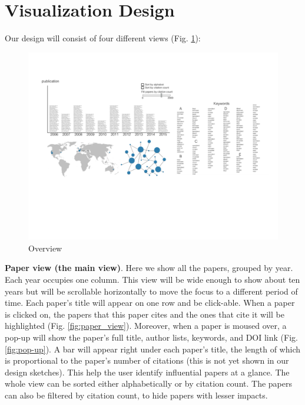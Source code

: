 \documentclass[dvips,12pt]{article}
\begin{document}
\section{Visualization Design}
Our design will consist of four different views (Fig. \ref*{fig:overview}):

\begin{figure}[htb!]
    \centering
    \includegraphics[width=\paperwidth]{visproposalDrawing_page_Part_1.pdf}
    \caption{Overview}
    \label{fig:overview}
\end{figure}

\textbf{Paper view (the main view)}. Here we show all the papers, grouped by year. Each year occupies one column. This view will be wide enough to show about ten years but will be scrollable horizontally to move the focus to a different period of time. Each paper's title will appear on one row and be click-able. When a paper is clicked on, the papers that this paper cites and the ones that cite it will be highlighted (Fig. \ref{fig:paper_view}). Moreover, when a paper is moused over, a pop-up will show the paper's full title, author lists, keywords, and DOI link (Fig. \ref{fig:pop-up}). A bar will appear right under each paper's title, the length of which is proportional to the paper's number of citations (this is not yet shown in our design sketches). This help the user identify influential papers at a glance. The whole view can be sorted either alphabetically or by citation count. The papers can also be filtered by citation count, to hide papers with lesser impacts.
\end{document}
